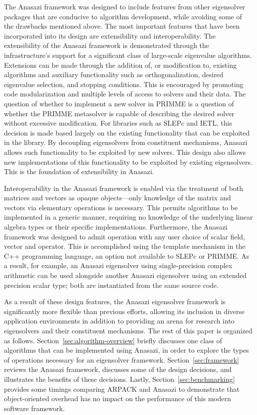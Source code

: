 \documentclass[acmtoms]{acmtrans2m}
\newcounter{algorithm}
\begin{document}
The Anasazi framework was designed to include features from other eigensolver packages
that are conducive to algorithm development, while avoiding some of the drawbacks
mentioned above. The most important features that have been incorporated into its design
are extensibility and interoperability. The extensibility of the Anasazi framework is
demonstrated through the infrastructure's support for a significant class of large-scale
eigenvalue algorithms. Extensions can be made through the addition of, or modification to,
existing algorithms and auxiliary functionality such as orthogonalization, desired
eigenvalue selection, and stopping conditions. This is encouraged by promoting code
modularization and multiple levels of access to solvers and their data.  The question of
whether to implement a new solver in PRIMME is a question of whether the PRIMME metasolver
is capable of describing the desired solver without excessive modification. For libraries
such as SLEPc and IETL, this decision is made based largely on the existing functionality
that can be exploited in the library. By decoupling eigensolvers from constituent
mechanisms, Anasazi allows such functionality to be exploited by new solvers. This design
also allows new implementations of this functionality to be exploited by existing
eigensolvers. This is the foundation of extensibility in Anasazi.

Interoperability in the Anasazi framework is enabled via the treatment of both matrices
and vectors as opaque objects---only knowledge of the matrix and vectors via elementary
operations is necessary. This permits algorithms to be implemented in a generic manner,
requiring no knowledge of the underlying linear algebra types or their specific
implementations. Furthermore, the Anasazi framework was designed to admit operation with
any user choice of scalar field, vector and operator. This is accomplished using the
template mechanism in the C++ programming language, an option not available to SLEPc or
PRIMME. As a result, for example, an Anasazi eigensolver using single-precision complex
arithmetic can be used alongside another Anasazi eigensolver using an extended precision
scalar type; both are instantiated from the same source code.

As a result of these design features, the Anasazi eigensolver framework is significantly
more flexible than previous efforts, allowing its inclusion in diverse application
environments in addition to providing an arena for research into eigensolvers and their
constituent mechanisms. The rest of this paper is organized as follows.
Section~\ref{sec:algorithm-overview} briefly discusses one class of algorithms that can be
implemented using Anasazi, in order to explore the types of operations necessary for an
eigensolver framework. Section~\ref{sec:framework} reviews the Anasazi framework,
discusses some of the design decisions, and illustrates the benefits of these decisions.
Lastly, Section~\ref{sec:benchmarking} provides some timings comparing ARPACK and Anasazi
to demonstrate that object-oriented overhead has no impact on the performance of this
modern software framework.
\end{document}
